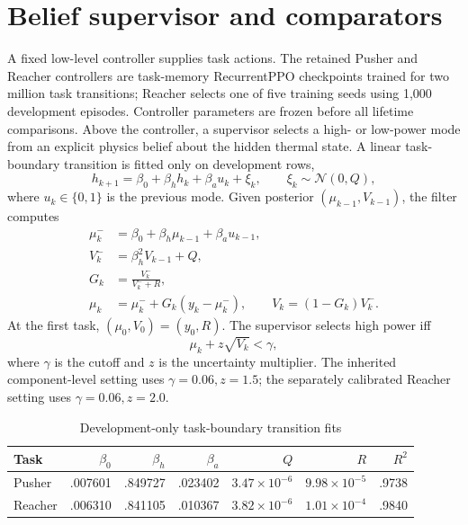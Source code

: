 \section{Belief supervisor and comparators}
\label{sec:method}

A fixed low-level controller supplies task actions. The retained Pusher and
Reacher controllers are task-memory RecurrentPPO checkpoints trained for two
million task transitions; Reacher selects one of five training seeds using
1,000 development episodes. Controller parameters are frozen before all
lifetime comparisons. Above the controller, a supervisor selects a high- or
low-power mode from an explicit physics belief about the hidden thermal state.
A linear task-boundary transition is fitted only on development rows,
\begin{equation}
 h_{k+1}=\beta_0+\beta_h h_k+\beta_a u_k+\xi_k,
 \qquad \xi_k\sim\mathcal{N}(0,Q),
 \label{eq:task-transition}
\end{equation}
where $u_k\in\{0,1\}$ is the previous mode. Given posterior
$(\mu_{k-1},V_{k-1})$, the filter computes
\begin{align}
 \mu_k^- &= \beta_0+\beta_h\mu_{k-1}+\beta_a u_{k-1}, \\
 V_k^- &= \beta_h^2V_{k-1}+Q, \\
 G_k &= \frac{V_k^-}{V_k^-+R}, \\
 \mu_k &= \mu_k^-+G_k(y_k-\mu_k^-),\qquad
 V_k=(1-G_k)V_k^- .
 \label{eq:belief-update}
\end{align}
At the first task, $(\mu_0,V_0)=(y_0,R)$. The supervisor selects high power iff
\begin{equation}
 \mu_k+z\sqrt{V_k}<\gamma,
 \label{eq:margin-decision}
\end{equation}
where $\gamma$ is the cutoff and $z$ is the uncertainty multiplier. The
inherited component-level setting uses $\gamma=0.06,z=1.5$; the separately
calibrated Reacher setting uses $\gamma=0.06,z=2.0$.

\begin{table}[t]
\caption{Development-only task-boundary transition fits}
\label{tab:transition-fits}
\centering
\begin{tabular}{lrrrrrr}
\toprule
Task & $\beta_0$ & $\beta_h$ & $\beta_a$ & $Q$ & $R$ & $R^2$ \\
\midrule
Pusher & .007601 & .849727 & .023402 & $3.47\!\times\!10^{-6}$ & $9.98\!\times\!10^{-5}$ & .9738 \\
Reacher & .006310 & .841105 & .010367 & $3.82\!\times\!10^{-6}$ & $1.01\!\times\!10^{-4}$ & .9840 \\
\bottomrule
\end{tabular}
\end{table}

